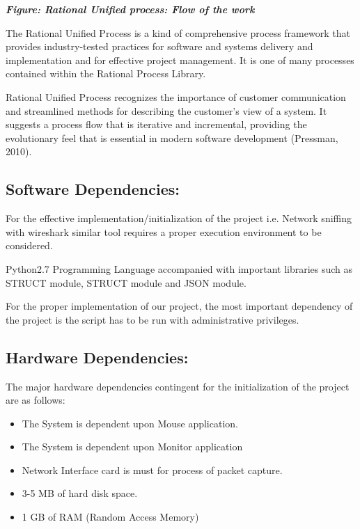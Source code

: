 \documentclass[12pt, a4paper]{report}
\begin{document}
\emph{\large \textbf{Figure: Rational Unified process: Flow of the work\\}}

The Rational Unified Process is a kind of comprehensive process
framework that provides industry-tested practices for software and
systems delivery and implementation and for effective project
management. It is one of many processes contained within the Rational
Process Library.

Rational Unified Process recognizes the importance of customer
communication and streamlined methods for describing the customer's view
of a system. It suggests a process flow that is iterative and
incremental, providing the evolutionary feel that is essential in modern
software development (Pressman, 2010).


\subsection{ Software Dependencies:}

For the effective implementation/initialization of the project i.e.
Network sniffing with wireshark similar tool requires a proper execution
environment to be considered.

Python2.7 Programming Language accompanied with important libraries such
as STRUCT module, STRUCT module and JSON module.

For the proper implementation of our project, the most important
dependency of the project is the script has to be run with
administrative privileges.


\subsection{Hardware Dependencies:}


The major hardware dependencies contingent for the initialization of the
project are as follows:

\begin{itemize}
\item
  The System is dependent upon Mouse application.
\item
  The System is dependent upon Monitor application
\item
  Network Interface card is must for process of packet capture.
\item
  3-5 MB of hard disk space.
\item
  1 GB of RAM (Random Access Memory)
\end{itemize}
\newpage
\bigbreak
\end{document}
